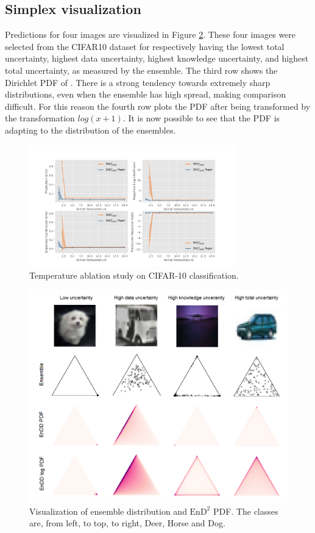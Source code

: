 \subsection{Simplex visualization}
Predictions for four images are visualized in Figure \ref{fig:3simplex}. These four images were selected from the CIFAR10 dataset for respectively having the lowest total uncertainty, highest data uncertainty, highest knowledge uncertainty, and highest total uncertainty, as measured by the ensemble. The third row shows the Dirichlet PDF of \EnDD. There is a strong tendency towards extremely sharp distributions, even when the ensemble has high spread, making comparison difficult. For this reason the fourth row plots the PDF after being transformed by the transformation $log(x + 1)$. It is now possible to see that the PDF is adapting to the distribution of the ensembles.

\begin{figure}[h]
    \centering
    \includegraphics[trim = 55 19 55 50, clip, width = 0.8\textwidth]{../openreview/plots/Figure_11.png}
    \caption{Temperature ablation study on CIFAR-10 classification.}
    \label{fig:temp-ablation}
\end{figure}

\begin{figure}[H]
    \centering
    \includegraphics[width = 0.8\linewidth]{../openreview/plots/all_simplex.png}
    \caption{Visualization of ensemble distribution and $\text{EnD}^2$ PDF. The classes are, from left, to top, to right, Deer, Horse and Dog.}
    \label{fig:3simplex}
\end{figure}

